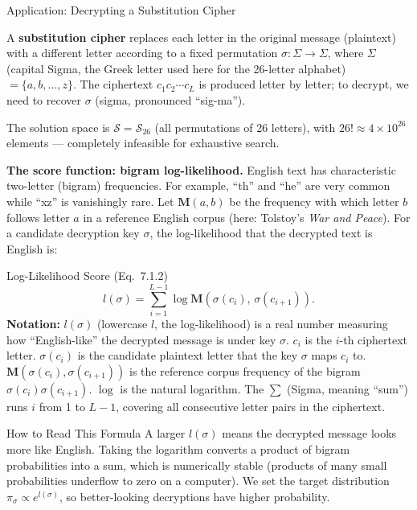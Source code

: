 \documentclass[aspectratio=169,10pt]{beamer}
\newcommand{\calS}{\mathcal{S}}
\begin{document}
\begin{frame}[allowframebreaks]{Application: Decrypting a Substitution Cipher}

A \textbf{substitution cipher} replaces each letter in the original message
(plaintext) with a different letter according to a fixed permutation
$\sigma : \Sigma \to \Sigma$, where $\Sigma$ (capital Sigma, the Greek
letter used here for the 26-letter alphabet) $= \{a, b, \ldots, z\}$.  The
ciphertext $c_1 c_2 \cdots c_L$ is produced letter by letter; to decrypt, we
need to recover $\sigma$ (sigma, pronounced ``sig-ma'').

The solution space is $\calS = \mathcal{S}_{26}$ (all permutations of 26
letters), with $26! \approx 4 \times 10^{26}$ elements --- completely
infeasible for exhaustive search.

\medskip
\textbf{The score function: bigram log-likelihood.}
English text has characteristic two-letter (bigram) frequencies.  For
example, ``th'' and ``he'' are very common while ``xz'' is vanishingly rare.
Let $\mathbf{M}(a,b)$ be the frequency with which letter $b$ follows letter
$a$ in a reference English corpus (here: Tolstoy's \emph{War and Peace}).
For a candidate decryption key $\sigma$, the log-likelihood that the
decrypted text is English is:

\begin{block}{Log-Likelihood Score (Eq.~7.1.2)}
  \[
    l(\sigma) = \sum_{i=1}^{L-1} \log \mathbf{M}(\sigma(c_i),\,\sigma(c_{i+1})).
  \]
  \textbf{Notation:} $l(\sigma)$ (lowercase $l$, the log-likelihood) is a
  real number measuring how ``English-like'' the decrypted message is under
  key $\sigma$.  $c_i$ is the $i$-th ciphertext letter.  $\sigma(c_i)$ is
  the candidate plaintext letter that the key $\sigma$ maps $c_i$ to.
  $\mathbf{M}(\sigma(c_i), \sigma(c_{i+1}))$ is the reference corpus
  frequency of the bigram $\sigma(c_i)\sigma(c_{i+1})$.  $\log$ is the
  natural logarithm.  The $\sum$ (Sigma, meaning ``sum'') runs $i$ from 1
  to $L-1$, covering all consecutive letter pairs in the ciphertext.
\end{block}

\begin{alertblock}{How to Read This Formula}
  A larger $l(\sigma)$ means the decrypted message looks more like English.
  Taking the logarithm converts a product of bigram probabilities into a
  sum, which is numerically stable (products of many small probabilities
  underflow to zero on a computer).  We set the target distribution
  $\pi_\sigma \propto e^{l(\sigma)}$, so better-looking decryptions have
  higher probability.
\end{alertblock}


\end{frame}
\end{document}
